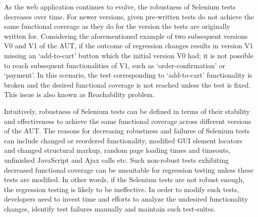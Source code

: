 As the web application continues to evolve, the robustness of Selenium tests decreases over time. For newer versions, given pre-written tests do not achieve the same functional coverage as they do for the version the tests are originally written for. Considering the aforementioned example of two subsequent versions V0 and V1 of the AUT, if the outcome of regression changes results in version V1 missing an ‘add-to-cart’ button which the initial version V0 had; it is not possible to reach subsequent functionalities of V1, such as ‘order-confirmation’ or ‘payment’. In this scenario, the test corresponding to ‘add-to-cart’ functionality is broken and the desired functional coverage is not reached unless the test is fixed. This issue is also known as Reachability problem.

Intuitively, robustness of Selenium tests can be defined in terms of their stability and effectiveness to achieve the same functional coverage across different versions of the AUT. The reasons for decreasing robustness and failures of Selenium tests can include changed or reordered functionality, modified GUI element locators and changed structural markup, random page loading times and timeouts, unfinished JavaScript and Ajax calls etc. Such non-robust tests exhibiting decreased functional coverage can be unsuitable for regression testing unless these tests are modified. In other words, if the Selenium tests are not robust enough, the regression testing is likely to be ineffective. In order to modify such tests, developers need to invest time and efforts to analyze the undesired functionality changes, identify test failures manually and maintain such test-suites. 

